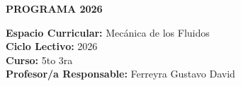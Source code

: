 \documentclass[11pt, a4paper]{article}
\begin{document}
\noindent\colorbox{schoolgreen}{\begin{minipage}{\dimexpr\textwidth-2\fboxsep}\centering \textbf{\fontsize{14}{16}\selectfont PROGRAMA 2026}\end{minipage}}

\vspace{1em}

\begin{flushleft}
\textbf{Espacio Curricular:} Mecánica de los Fluidos \\
\textbf{Ciclo Lectivo:} 2026 \\
\textbf{Curso:} 5to 3ra \\
\textbf{Profesor/a Responsable:} Ferreyra Gustavo David
\end{flushleft}

\vspace{1em}
\end{document}
